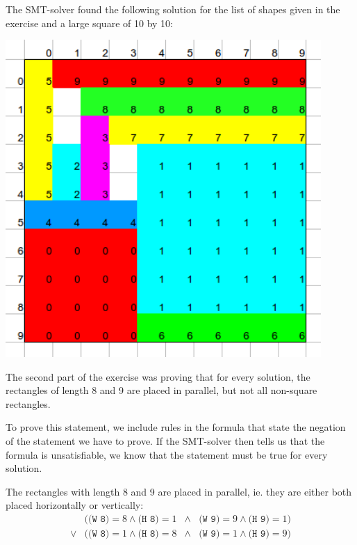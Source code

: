 \documentclass[12pt]{article}
\begin{document}
The SMT-solver found the following solution for the list of shapes given in the exercise and a large square of 10 by 10:\\
\begin{center}
    \includegraphics[width=12cm]{rectangles.png}
\end{center}

The second part of the exercise was proving that for every solution, 
the rectangles of length 8 and 9 are placed in parallel, 
but not all non-square rectangles. 

To prove this statement, we include rules in the formula 
that state the negation of the statement we have to prove.
If the SMT-solver then tells us that the formula is unsatisfiable, we know that the statement must be true for every solution. 


The rectangles with length 8 and 9 are placed in parallel, 
ie. they are either both placed horizontally or vertically:
\[
    \begin{array}{rlcl}
    & (\texttt{(W 8)} = 8 \wedge \texttt{(H 8)} = 1 & \wedge & \texttt{(W 9)} = 9 \wedge \texttt{(H 9)} = 1) \\
    \vee & (\texttt{(W 8)} = 1 \wedge \texttt{(H 8)} = 8 & \wedge & \texttt{(W 9)} = 1 \wedge \texttt{(H 9)} = 9)
    \end{array}
\]
\end{document}
